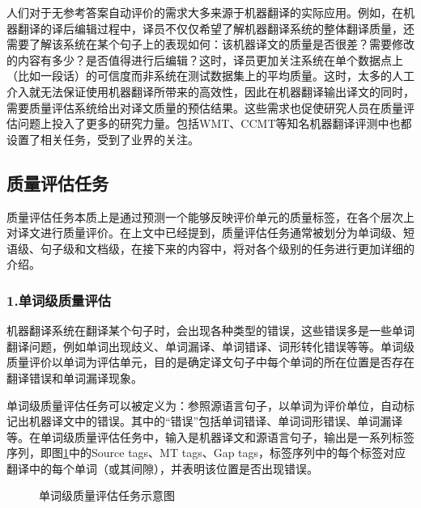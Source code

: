 \parinterval 人们对于无参考答案自动评价的需求大多来源于机器翻译的实际应用。例如，在机器翻译的译后编辑过程中，译员不仅仅希望了解机器翻译系统的整体翻译质量，还需要了解该系统在某个句子上的表现如何：该机器译文的质量是否很差？需要修改的内容有多少？是否值得进行后编辑？这时，译员更加关注系统在单个数据点上（比如一段话）的可信度而非系统在测试数据集上的平均质量。这时，太多的人工介入就无法保证使用机器翻译所带来的高效性，因此在机器翻译输出译文的同时，需要质量评估系统给出对译文质量的预估结果。这些需求也促使研究人员在质量评估问题上投入了更多的研究力量。包括WMT、CCMT等知名机器翻译评测中也都设置了相关任务，受到了业界的关注。


\subsection{质量评估任务}

\parinterval 质量评估任务本质上是通过预测一个能够反映评价单元的质量标签，在各个层次上对译文进行质量评价。在上文中已经提到，质量评估任务通常被划分为单词级、短语级、句子级和文档级，在接下来的内容中，将对各个级别的任务进行更加详细的介绍。


\subsubsection{1.单词级质量评估}

\parinterval 机器翻译系统在翻译某个句子时，会出现各种类型的错误，这些错误多是一些单词翻译问题，例如单词出现歧义、单词漏译、单词错译、词形转化错误等等。单词级质量评价以单词为评估单元，目的是确定译文句子中每个单词的所在位置是否存在翻译错误和单词漏译现象。

\parinterval 单词级质量评估任务可以被定义为：参照源语言句子，以单词为评价单位，自动标记出机器译文中的错误。其中的“错误”包括单词错译、单词词形错误、单词漏译等。在单词级质量评估任务中，输入是机器译文和源语言句子，输出是一系列标签序列，即图\ref{fig:4-11}中的Source tags、MT tags、Gap tags，标签序列中的每个标签对应翻译中的每个单词（或其间隙），并表明该位置是否出现错误。

\begin{figure}[htp]
    \centering
	
   \caption{单词级质量评估任务示意图}
   \label{fig:4-11}
\end{figure}

